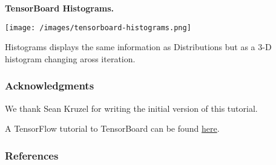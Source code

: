 \textbf{TensorBoard Histograms.}

\texttt{[image: /images/tensorboard-histograms.png]}

Histograms displays the same information as Distributions but as a 3-D
histogram changing aross iteration.

\subsubsection{Acknowledgments}

We thank Sean Kruzel for writing the initial version of this
tutorial.

A TensorFlow tutorial to TensorBoard can be found
\href{https://www.tensorflow.org/get_started/summaries_and_tensorboard}
{here}.

\subsubsection{References}\label{references}
